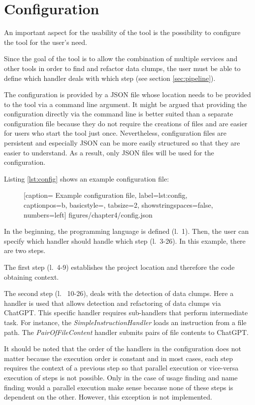 \section{Configuration}\label{sec:config}
An important aspect for the usability of the tool is the possibility to configure the tool for the user's need. 

Since the goal of the tool is to allow the combination of multiple services and other tools in order to find and refactor data clumps, the user must be able to define which handler deals with which step (see section \ref{sec:pipeline}).

The configuration is provided by a \ac{JSON} file whose location needs to be provided to the tool via a command line argument. It might be argued that providing the configuration directly via the command line is better suited than a separate configuration file because they do not require the creations of files and are easier for users who start the tool just once. Nevertheless, configuration files are persistent and especially \ac{JSON} can be more easily structured so that they are easier to understand. As a result, only \ac{JSON} files will be used  for the configuration. 


Listing \ref{lst:config} shows an example configuration file:
  \begin{figure} [htbp!]
			
			[caption={ Example configuration file},
			label={lst:config},
			captionpos=b, basicstyle=\footnotesize, tabsize=2, showstringspaces=false,  numbers=left]
			{figures/chapter4/config.json}
		\end{figure}


In the beginning, the programming language is defined (l.~1). Then, the user can specify which handler should handle which step (l.~3-26). In this example, there are two steps. 

The first step (l.~4-9) establishes the project location and therefore the code obtaining context.

The second step (l.~ 10-26), deals with the detection of data clumps. Here a handler is used that allows detection and refactoring of data clumps via ChatGPT. This specific handler requires sub-handlers that perform intermediate task. For instance, the \textit{SimpleInstructionHandler} loads an instruction from a file path. The \textit{PairOfFileContent} handler submits pairs of file contents to ChatGPT.

It should be noted that the order of the handlers in the configuration  does not matter because the execution order is constant and in most cases, each step requires the context of a previous step so that parallel execution or vice-versa execution of steps is not possible. Only in the case of usage finding and name finding would a parallel execution make sense because none of these steps is dependent on the other.  However, this exception is not implemented.

